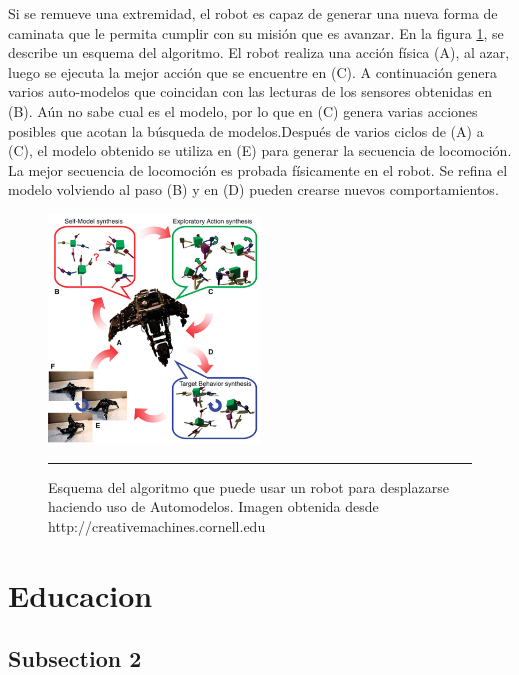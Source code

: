 Si se remueve una extremidad, el robot es capaz de generar una nueva forma de caminata que le permita cumplir con su misión que es avanzar.
En la figura \ref{fig:AutomodeladoLIPSON}, se describe un esquema del algoritmo. El robot realiza una acción física (A), al azar, luego se ejecuta la mejor acción que se encuentre en (C). A continuación genera varios auto-modelos que coincidan con las lecturas de los sensores obtenidas en (B). Aún no sabe cual es el modelo, por lo que en (C) genera varias acciones posibles que acotan la búsqueda de modelos.Después de varios ciclos de (A) a (C),  el modelo obtenido se utiliza en (E) para generar la secuencia de locomoción. La mejor secuencia de locomoción es probada físicamente en el robot. Se refina el modelo volviendo al paso (B) y en (D) pueden crearse nuevos comportamientos.

\begin{figure}[htbp]
	\centering
		\includegraphics[width=0.5\textwidth]{./Figures/algoritmo_automodelo.png}
		\rule{35em}{0.5pt}
	\caption[AutomodeladoLIPSON]{Esquema del algoritmo que puede usar un robot para desplazarse haciendo uso de Automodelos. Imagen obtenida desde http://creativemachines.cornell.edu}
	\label{fig:AutomodeladoLIPSON}
\end{figure}


\section{Educacion}


\subsection{Subsection 2}
